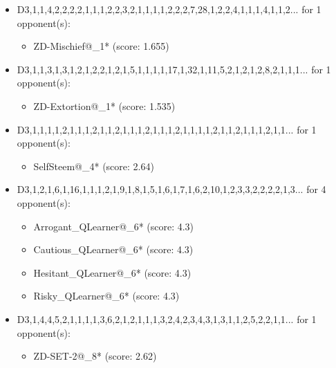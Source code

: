 \begin{appendices}
\begin{itemize}
    \item D3,1,1,4,2,2,2,2,1,1,1,2,2,3,2,1,1,1,1,2,2,2,7,28,1,2,2,4,1,1,1,4,1,1,2... for 1 opponent(s):
    \begin{multicols}{3}
         \begin{itemize}
            \item ZD-Mischief@\_1* (score: 1.655)
        \end{itemize}
     \end{multicols}
     
    \item D3,1,1,3,1,3,1,2,1,2,2,1,2,1,5,1,1,1,1,17,1,32,1,11,5,2,1,2,1,2,8,2,1,1,1... for 1 opponent(s):
    \begin{multicols}{3}
         \begin{itemize}
            \item ZD-Extortion@\_1* (score: 1.535)
        \end{itemize}
     \end{multicols}
     
    \item D3,1,1,1,1,2,1,1,1,2,1,1,2,1,1,1,2,1,1,1,2,1,1,1,1,2,1,1,2,1,1,1,2,1,1... for 1 opponent(s):
    \begin{multicols}{3}
         \begin{itemize}
            \item SelfSteem@\_4* (score: 2.64)
        \end{itemize}
     \end{multicols}
     
    \item D3,1,2,1,6,1,16,1,1,1,2,1,9,1,8,1,5,1,6,1,7,1,6,2,10,1,2,3,3,2,2,2,2,1,3... for 4 opponent(s):
    \begin{multicols}{3}
         \begin{itemize}
            \item Arrogant\_QLearner@\_6* (score: 4.3)
            \item Cautious\_QLearner@\_6* (score: 4.3)
            \item Hesitant\_QLearner@\_6* (score: 4.3)
            \item Risky\_QLearner@\_6* (score: 4.3)
        \end{itemize}
     \end{multicols}
     
    \item D3,1,4,4,5,2,1,1,1,1,3,6,2,1,2,1,1,1,3,2,4,2,3,4,3,1,3,1,1,2,5,2,2,1,1... for 1 opponent(s):
    \begin{multicols}{3}
         \begin{itemize}
            \item ZD-SET-2@\_8* (score: 2.62)
        \end{itemize}
     \end{multicols}
     

\end{itemize}
\end{appendices}
